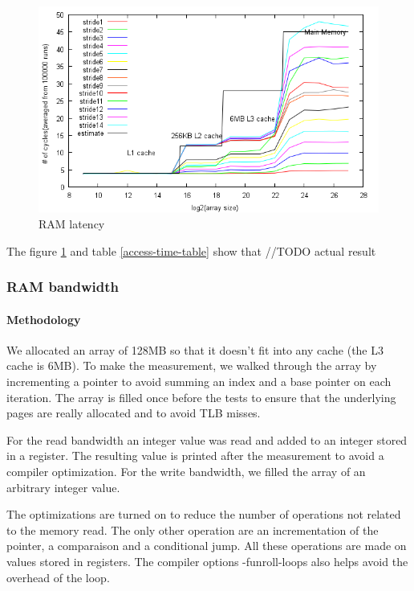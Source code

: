 \begin{figure}[h]
\begin{center}
\includegraphics[scale=0.8]{memoryLatencyImage}
\end{center}
\caption {RAM latency\label{fig:access-timef}}

\end{figure}



The figure \ref{fig:access-timef} and table \ref{access-time-table} show that  //TODO actual result




\subsubsection{RAM bandwidth}
\paragraph{Methodology}
We allocated an array of 128MB so that it doesn't fit into any cache (the L3 cache is 6MB).
To make the measurement, we walked through the array by incrementing a pointer to avoid summing an index and a base pointer on each iteration.
The array is filled once before the tests to ensure that the underlying pages are really allocated and to avoid TLB misses.


For the read bandwidth an integer value was read and added to an integer stored in a register.
The resulting value is printed after the measurement to avoid a compiler optimization.
For the write bandwidth, we filled the array of an arbitrary integer value.

The optimizations are turned on to reduce the number of operations not related to the memory read.
The only other operation are an incrementation of the pointer, a comparaison and a conditional jump.
All these operations are made on values stored in registers.
The compiler options -funroll-loops also helps avoid the overhead of the loop.

